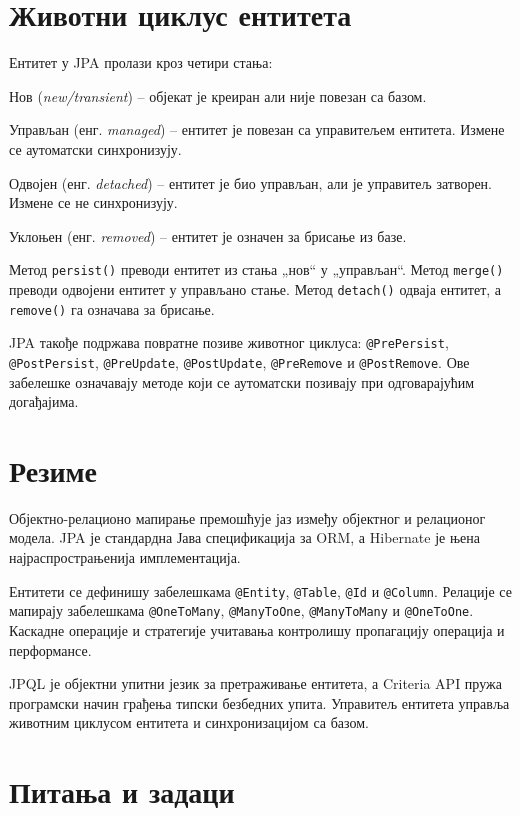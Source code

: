 \section{Животни циклус ентитета}

Ентитет у JPA пролази кроз четири стања:

Нов (\textit{new/transient}) – објекат је креиран али није повезан са базом.

Управљан (енг. \textit{managed}) – ентитет је повезан са управитељем ентитета. Измене се аутоматски синхронизују.

Одвојен (енг. \textit{detached}) – ентитет је био управљан, али је управитељ затворен. Измене се не синхронизују.

Уклоњен (енг. \textit{removed}) – ентитет је означен за брисање из базе.

Метод \texttt{persist()} преводи ентитет из стања „нов“ у „управљан“. Метод \texttt{merge()} преводи одвојени ентитет у управљано стање. Метод \texttt{detach()} одваја ентитет, а \texttt{remove()} га означава за брисање.

JPA такође подржава повратне позиве животног циклуса: \texttt{@PrePersist}, \texttt{@PostPersist}, \texttt{@PreUpdate}, \texttt{@PostUpdate}, \texttt{@PreRemove} и \texttt{@PostRemove}. Ове забелешке означавају методе који се аутоматски позивају при одговарајућим догађајима.


\section{Резиме}

Објектно-релационо мапирање премошћује јаз између објектног и релационог модела. JPA је стандардна Јава спецификација за ORM, а Hibernate је њена најраспрострањенија имплементација.

Ентитети се дефинишу забелешкама \texttt{@Entity}, \texttt{@Table}, \texttt{@Id} и \texttt{@Column}. Релације се мапирају забелешкама \texttt{@OneToMany}, \texttt{@ManyToOne}, \texttt{@ManyToMany} и \texttt{@OneToOne}. Каскадне операције и стратегије учитавања контролишу пропагацију операција и перформансе.

JPQL је објектни упитни језик за претраживање ентитета, а Criteria API пружа програмски начин грађења типски безбедних упита. Управитељ ентитета управља животним циклусом ентитета и синхронизацијом са базом.


\section{Питања и задаци}

